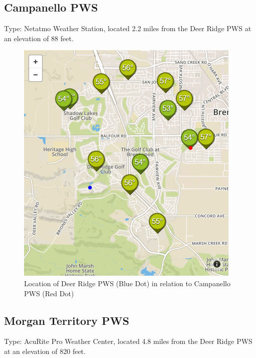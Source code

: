 \documentclass[sigconf]{acmart}
\begin{document}
\subsection{Campanello PWS}

Type: Netatmo Weather Station, located 2.2 miles from the Deer Ridge PWS at an elevation of 88 feet.

\begin{figure}[H]
    \centering
    \includegraphics[width=\columnwidth]{images/DR_Campinello.PNG}
    \caption{Location of Deer Ridge PWS (Blue Dot) in relation to Campanello PWS (Red Dot)}
\end{figure}

\subsection{Morgan Territory PWS} 

Type: AcuRite Pro Weather Center, located 4.8 miles from the Deer Ridge PWS at an elevation of 820 feet.
\end{document}
